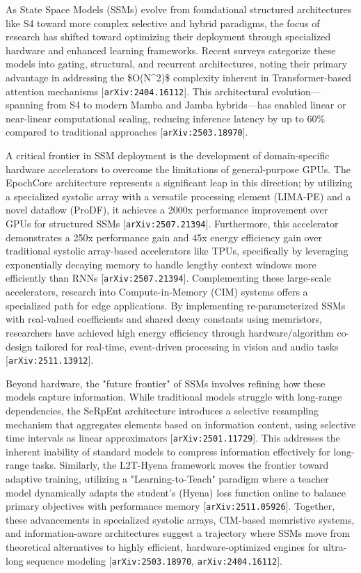 \documentclass[11pt]{article}
\begin{document}
As State Space Models (SSMs) evolve from foundational structured architectures like S4 toward more complex selective and hybrid paradigms, the focus of research has shifted toward optimizing their deployment through specialized hardware and enhanced learning frameworks. Recent surveys categorize these models into gating, structural, and recurrent architectures, noting their primary advantage in addressing the \$O(N\textasciicircum{}2)\$ complexity inherent in Transformer-based attention mechanisms [\texttt{arXiv:2404.16112}]. This architectural evolution—spanning from S4 to modern Mamba and Jamba hybrids—has enabled linear or near-linear computational scaling, reducing inference latency by up to 60\% compared to traditional approaches [\texttt{arXiv:2503.18970}].

A critical frontier in SSM deployment is the development of domain-specific hardware accelerators to overcome the limitations of general-purpose GPUs. The EpochCore architecture represents a significant leap in this direction; by utilizing a specialized systolic array with a versatile processing element (LIMA-PE) and a novel dataflow (ProDF), it achieves a 2000x performance improvement over GPUs for structured SSMs [\texttt{arXiv:2507.21394}]. Furthermore, this accelerator demonstrates a 250x performance gain and 45x energy efficiency gain over traditional systolic array-based accelerators like TPUs, specifically by leveraging exponentially decaying memory to handle lengthy context windows more efficiently than RNNs [\texttt{arXiv:2507.21394}]. Complementing these large-scale accelerators, research into Compute-in-Memory (CIM) systems offers a specialized path for edge applications. By implementing re-parameterized SSMs with real-valued coefficients and shared decay constants using memristors, researchers have achieved high energy efficiency through hardware/algorithm co-design tailored for real-time, event-driven processing in vision and audio tasks [\texttt{arXiv:2511.13912}].

Beyond hardware, the "future frontier" of SSMs involves refining how these models capture information. While traditional models struggle with long-range dependencies, the SeRpEnt architecture introduces a selective resampling mechanism that aggregates elements based on information content, using selective time intervals as linear approximators [\texttt{arXiv:2501.11729}]. This addresses the inherent inability of standard models to compress information effectively for long-range tasks. Similarly, the L2T-Hyena framework moves the frontier toward adaptive training, utilizing a "Learning-to-Teach" paradigm where a teacher model dynamically adapts the student's (Hyena) loss function online to balance primary objectives with performance memory [\texttt{arXiv:2511.05926}]. Together, these advancements in specialized systolic arrays, CIM-based memristive systems, and information-aware architectures suggest a trajectory where SSMs move from theoretical alternatives to highly efficient, hardware-optimized engines for ultra-long sequence modeling [\texttt{arXiv:2503.18970}, \texttt{arXiv:2404.16112}].
\end{document}
